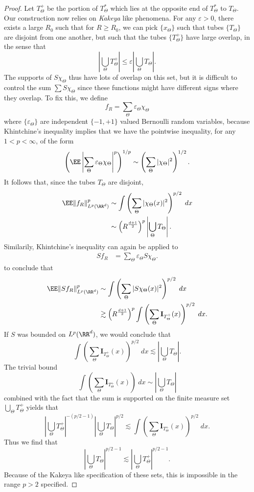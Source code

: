 \begin{proof}
    Let $T_\Theta^+$ be the portion of $T_\Theta^*$ which lies at the opposite end of $T_\Theta^*$ to $T_\Theta$. Our construction now relies on \emph{Kakeya} like phenomena. For any $\varepsilon > 0$, there exists a large $R_0$ such that for $R \geq R_0$, we can pick $\{ x_\Theta \}$ such that tubes $\{ T_\Theta \}$ are disjoint from one another, but such that the tubes $\{ T_\Theta^+ \}$ have large overlap, in the sense that
    \[ | \bigcup_\Theta T_\Theta^+ | \leq \varepsilon | \bigcup_\Theta T_\Theta|. \]
    The supports of $S \chi_\Theta$ thus have lots of overlap on this set, but it is difficult to control the sum $\sum S \chi_\Theta$ since these functions might have different signs where they overlap. To fix this, we define
    \[ f_R = \sum_\Theta \varepsilon_\Theta \chi_\Theta \]
    where $\{ \varepsilon_\Theta \}$ are independent $\{ -1, +1 \}$ valued Bernoulli random variables, because Khintchine's inequality implies that we have the pointwise inequality, for any $1 < p < \infty$, of the form
    \[ \left( \EE \left| \sum_\Theta \varepsilon_\Theta \chi_\Theta \right|^p \right)^{1/p} \sim \left( \sum_\Theta |\chi_\Theta|^2 \right)^{1/2}. \]
    It follows that, since the tubes $T_\Theta$ are disjoint,
    \begin{align*}
        \EE \| f_R \|_{L^p(\RR^d)}^p &\sim \int \left( \sum_\Theta |\chi_\Theta(x)|^2 \right)^{p/2}\; dx\\
        &\sim \left( R^{\frac{d+1}{2}} \right)^p \left| \bigcup_\Theta T_\Theta \right|.
    \end{align*}
    Similarily, Khintchine's inequality can again be applied to
    \begin{align*}
        Sf_R &= \sum_\Theta \varepsilon_\Theta S \chi_\Theta.
    \end{align*}
    to conclude that
    \begin{align*}
        \EE \| Sf_R \|_{L^p(\RR^d)}^p &\sim \int \left( \sum_\Theta |S \chi_\Theta(x)|^2 \right)^{p/2}\; dx\\
        &\gtrsim \left( R^{\frac{d+1}{2}} \right)^p \int \left( \sum_\Theta \mathbf{I}_{T_\Theta^+}(x) \right)^{p/2}\; dx.
    \end{align*}
    If $S$ was bounded on $L^p(\RR^d)$, we would conclude that
    \[ \int \left( \sum_\Theta \mathbf{I}_{T_\Theta^+}(x) \right)^{p/2}\; dx \lesssim \left| \bigcup_\Theta T_\Theta \right|. \]
    The trivial bound
    \[ \int \left( \sum_\Theta \mathbf{I}_{T_\Theta^+}(x) \right)\; dx \sim \left| \bigcup_\Theta T_\Theta \right| \]
    combined with the fact that the sum is supported on the finite measure set $\bigcup_\Theta T_\Theta^+$ yields that
    \[ \left| \bigcup_\Theta T_\Theta^+ \right|^{-(p/2 - 1)} \left| \bigcup_\Theta T_\Theta \right|^{p/2} \lesssim \int \left( \sum_\Theta \mathbf{I}_{T_\Theta^+}(x) \right)^{p/2}\; dx. \]
    Thus we find that
    \[ \left| \bigcup_\Theta T_\Theta \right|^{p/2 - 1} \lesssim  \left| \bigcup_\Theta T_\Theta^+ \right|^{p/2 - 1}. \]
    Because of the Kakeya like specification of these sets, this is impossible in the range $p > 2$ specified.
\end{proof}

